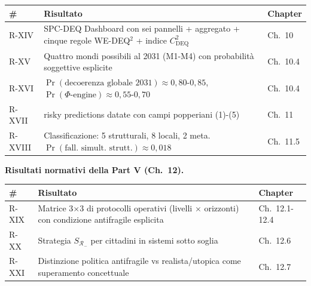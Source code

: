 {\def\LTcaptype{none} %
{\small\begin{longtable}[]{@{}
  >{\raggedright\arraybackslash}p{}
  >{\raggedright\arraybackslash}p{}
  >{\raggedright\arraybackslash}p{}@{}}
\toprule\noalign{}
\begin{minipage}[b]{\linewidth}\raggedright
\#
\end{minipage} & \begin{minipage}[b]{\linewidth}\raggedright
Risultato
\end{minipage} & \begin{minipage}[b]{\linewidth}\raggedright
Chapter
\end{minipage} \\
\midrule\noalign{}
\endhead
\bottomrule\noalign{}
\endlastfoot
R-XIV & SPC-DEQ Dashboard con sei pannelli + aggregato + cinque regole
WE-DEQ$^2$ + indice \(C_{\text{DEQ}}^2\) & Ch.~10 \\
R-XV & Quattro mondi possibili al 2031 (M1-M4) con probabilità
soggettive esplicite & Ch.~10.4 \\
R-XVI &
\(\Pr(\text{decoerenza globale 2031}) \approx 0{,}80\)-\(0{,}85\),
\(\Pr(\Phi\text{-engine}) \approx 0{,}55\)-\(0{,}70\) & Ch.~10.4 \\
R-XVII & 16 risky predictions datate con campi popperiani (1)-(5) &
Ch.~11 \\
R-XVIII & Classificazione: 5 strutturali, 8 locali, 2 meta.
\(\Pr(\text{fall. simult. strutt.}) \approx 0{,}018\) & Ch.~11.5 \\
\end{longtable}}
}

\Proved{} \textbf{Risultati normativi della Part V (Ch.~12).}

{\def\LTcaptype{none} %
{\small\begin{longtable}[]{@{}
  >{\raggedright\arraybackslash}p{}
  >{\raggedright\arraybackslash}p{}
  >{\raggedright\arraybackslash}p{}@{}}
\toprule\noalign{}
\begin{minipage}[b]{\linewidth}\raggedright
\#
\end{minipage} & \begin{minipage}[b]{\linewidth}\raggedright
Risultato
\end{minipage} & \begin{minipage}[b]{\linewidth}\raggedright
Chapter
\end{minipage} \\
\midrule\noalign{}
\endhead
\bottomrule\noalign{}
\endlastfoot
R-XIX & Matrice 3$\times$3 di protocolli operativi (livelli $\times$ orizzonti) con
condizione antifragile esplicita & Ch.~12.1-12.4 \\
R-XX & Strategia \(S_{\mathcal{R}_-}\) per cittadini in sistemi sotto
soglia & Ch.~12.6 \\
R-XXI & Distinzione politica antifragile vs realista/utopica come
superamento concettuale & Ch.~12.7 \\
\end{longtable}}
}

